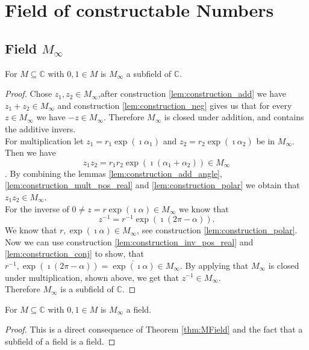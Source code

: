\chapter{Field of constructable Numbers}
\section[Filed of Constructable Numbers]{Field $M_{\infty}$}
\begin{theorem}
    \label{thm:MField}
    \leanok
    For $M\subseteq \mathbb{C}$ with $0,1 \in M$ is $M_{\infty}$ a subfield of $\mathbb{C}$.
\end{theorem}
\begin{proof}
    Chose $z_1, z_2 \in M_{\infty}$,after construction \ref{lem:construction_add}
    we have $z_1 + z_2 \in M_{\infty}$ and construction \ref{lem:construction_neg}
    gives us that for every $z \in M_{\infty}$ we have $-z \in M_{\infty}$. Therefore $M_{\infty}$ is closed under addition, and contains the additive invers.\\
    For multiplication let $z_1 = r_1 \exp(\imath \alpha_1)$ and $z_2 = r_2 \exp(\imath \alpha_2)$ be in $M_{\infty}$. Then we have 
    $$z_1 z_2 = r_1 r_2 \exp(\imath (\alpha_1 + \alpha_2)) \in M_{\infty}$$. By combining the lemmas \ref{lem:construction_add_angle}, \ref{lem:construction_mult_pos_real} and \ref{lem:construction_polar}
    we obtain that $z_1 z_2 \in M_{\infty}$.\\
    For the inverse of $0 \ne z = r \exp(\imath \alpha) \in M_{\infty}$ we know that $$z^{-1} = r^{-1} \exp(\imath(2\pi - \alpha)).$$ We know that $r, \exp(\imath \alpha) \in M_{\infty}$, see construction \ref{lem:construction_polar}.
    Now we can use construction \ref{lem:construction_inv_pos_real} and \ref{lem:construction_conj} to show,
    that $r^{-1}, \exp(\imath(2\pi - \alpha)) = \overline{\exp(\imath\alpha)} \in M_{\infty}$. By applying that $M_{\infty}$ is closed under multiplication, shown above, we get that $z^{-1} \in M_{\infty}$.\\
    Therefore $M_{\infty}$ is a subfield of $\mathbb{C}$.
\end{proof}

\begin{corollary}
    \label{cor:MField_field}
    \leanok
    For $M\subseteq \mathbb{C}$ with $0,1 \in M$ is $M_{\infty}$ a field.
\end{corollary}
\begin{proof}
    This is a direct consequence of Theorem \ref{thm:MField} and the fact that a subfield of a field is a field.
\end{proof}


